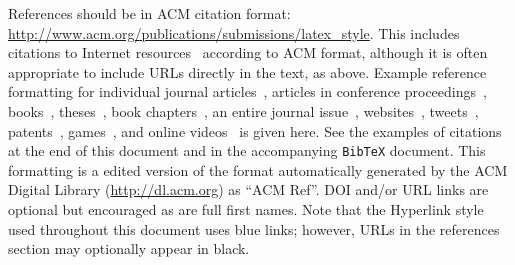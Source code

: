 \documentclass[sigchi-a, authorversion]{acmart}
\begin{document}
References should be in ACM citation format:
\url{http://www.acm.org/publications/submissions/latex_style}.  This
includes citations to Internet
resources~\cite{CHINOSAUR:venue,cavender:writing,psy:gangnam}
according to ACM format, although it is often appropriate to include
URLs directly in the text, as above. Example reference formatting for
individual journal articles~\cite{ethics}, articles in conference
proceedings~\cite{Klemmer:2002:WSC:503376.503378},
books~\cite{Schwartz:1995:GBF}, theses~\cite{sutherland:sketchpad},
book chapters~\cite{winner:politics}, an entire journal
issue~\cite{kaye:puc},
websites~\cite{acm_categories,cavender:writing},
tweets~\cite{CHINOSAUR:venue}, patents~\cite{heilig:sensorama}, 
games~\cite{supermetroid:snes}, and
online videos~\cite{psy:gangnam} is given here.  See the examples of
citations at the end of this document and in the accompanying
\texttt{BibTeX} document. This formatting is a edited version of the
format automatically generated by the ACM Digital Library
(\url{http://dl.acm.org}) as ``ACM Ref''. DOI and/or URL links are
optional but encouraged as are full first names. Note that the
Hyperlink style used throughout this document uses blue links;
however, URLs in the references section may optionally appear in
black.







\end{document}
